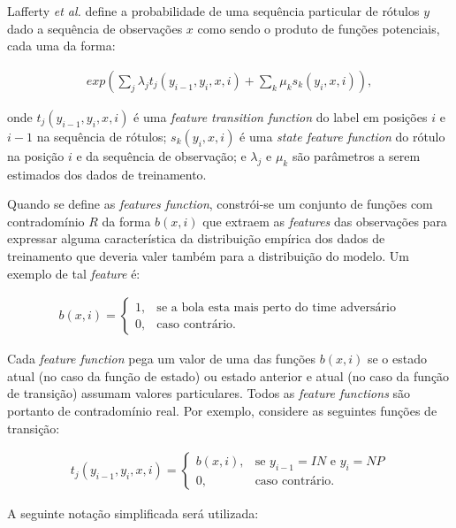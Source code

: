 Lafferty \textit{et al.} \cite{Lafferty} define a probabilidade de uma sequência particular
de rótulos $y$ dado a sequência de observações $x$ como sendo o produto de funções potenciais,
cada uma da forma:

\begin{eqnarray}
  exp(\sum_j \lambda_j t_j(y_{i-1},y_i,x,i) + \sum_k \mu_k s_k(y_i,x,i)),\label{crf_eq}
\end{eqnarray}

onde $t_j(y_{i-1},y_i,x,i)$ é uma \textit{feature transition function} do label em posições
$i$ e $i-1$ na sequência de rótulos; $s_k(y_i,x,i)$ é uma \textit{state feature function} do
rótulo na posição $i$ e da sequência de observação; e $\lambda_j$ e $\mu_k$ são parâmetros a
serem estimados dos dados de treinamento.

Quando se define as \textit{features function}, constrói-se um conjunto de funções com
contradomínio $R$ da forma $b(x,i)$ que extraem as \textit{features} das observações para
expressar alguma característica da distribuição empírica dos dados de treinamento que deveria
valer também para a distribuição do modelo. Um exemplo de tal \textit{feature} é:

\begin{eqnarray}
  b(x,i)=
  \left\{
    \begin{array}{rc}
      1, & \mbox{se a bola esta mais perto do time adversário}\\
      0, & \mbox{caso contrário}.
    \end{array}
  \right.
\end{eqnarray}

Cada \textit{feature function} pega um valor de uma das funções $b(x,i)$ se o estado atual
(no caso da função de estado) ou estado anterior e atual (no caso da função de transição)
assumam valores particulares. Todos as \textit{feature functions} são portanto de contradomínio
real. Por exemplo, considere as seguintes funções de transição:

\begin{eqnarray}
  t_j(y_{i-1},y_i,x,i)=
  \left\{
    \begin{array}{rc}
      b(x,i), & \mbox{se $y_{i-1}=IN$ e $y_i=NP$}\\
      0,      & \mbox{caso contrário}.
    \end{array}
  \right.
\end{eqnarray}

A seguinte notação simplificada será utilizada:

